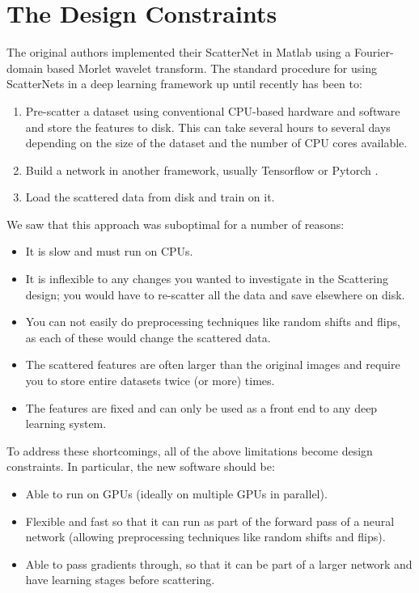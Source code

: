 \section{The Design Constraints}
The original authors implemented their ScatterNet in Matlab \cite{oyallon_deep_2015} using
a Fourier-domain based Morlet wavelet transform. 
The standard procedure for using ScatterNets in a deep learning
framework up until recently has been to:
\begin{enumerate}
  \item Pre-scatter a dataset using conventional CPU-based hardware and software
    and store the features to disk. This can take several hours to several days
    depending on the size of the dataset and the number of CPU cores available.
  \item Build a network in another framework, usually Tensorflow \cite{abadi_tensorflow:_2015}
    or Pytorch \cite{paszke_automatic_2017}.
  \item Load the scattered data from disk and train on it.
\end{enumerate} 
We saw that this approach was suboptimal for a number of reasons:
\begin{itemize}
  \item It is slow and must run on CPUs.
  \item It is inflexible to any changes you wanted to investigate in the
    Scattering design; you would have to re-scatter all the data and save
    elsewhere on disk.
  \item You can not easily do preprocessing techniques like random shifts and
    flips, as each of these would change the scattered data.
  \item The scattered features are often larger than the original images and 
    require you to store entire datasets twice (or more) times.
  \item The features are fixed and can only be used as a front end to any
    deep learning system.
\end{itemize}

To address these shortcomings, all of the above limitations become design
constraints. In particular, the new software should be:
\begin{itemize}
  \item Able to run on GPUs (ideally on multiple GPUs in parallel).
  \item Flexible and fast so that it can run as part of the forward pass of
    a neural network (allowing preprocessing techniques like random shifts and
    flips).
  \item Able to pass gradients through, so that it can be part of a larger
    network and have learning stages before scattering.
\end{itemize}

